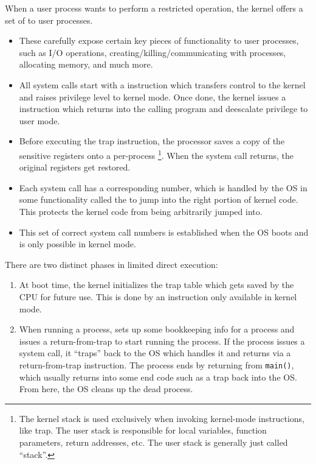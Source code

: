 When a user process wants to perform a restricted operation, the kernel offers a set of  to user processes.
\begin{itemize}
    \item These carefully expose certain key pieces of functionality to user processes, such as I/O operations, creating/killing/communicating with processes, allocating memory, and much more.
    \item  All system calls start with a  instruction which transfers control to the kernel and raises privilege level to kernel mode. Once done, the kernel issues a  instruction which returns into the calling program and deescalate privilege to user mode.
    \item Before executing the trap instruction, the processor saves a copy of the sensitive registers onto a per-process \footnote{The kernel stack is used exclusively when invoking kernel-mode instructions, like trap. The user stack is responsible for local variables, function parameters, return addresses, etc. The user stack is generally just called ``stack''.}. When the system call returns, the original registers get restored.
    \item Each system call has a corresponding number, which is handled by the OS in some functionality called the  to jump into the right portion of kernel code. This protects the kernel code from being arbitrarily jumped into.
    \item This set of correct system call numbers is established when the OS boots and is only possible in kernel mode.
\end{itemize}

There are two distinct phases in limited direct execution:
\begin{enumerate}
    \item At boot time, the kernel initializes the trap table which gets saved by the CPU for future use. This is done by an instruction only available in kernel mode.
    \item When running a process, sets up some bookkeeping info for a process and issues a return-from-trap to start running the process. If the process issues a system call, it ``traps'' back to the OS which handles it and returns via a return-from-trap instruction. The process ends by returning from \texttt{main()}, which usually returns into some end code such as a trap back into the OS. From here, the OS cleans up the dead process.
\end{enumerate}

